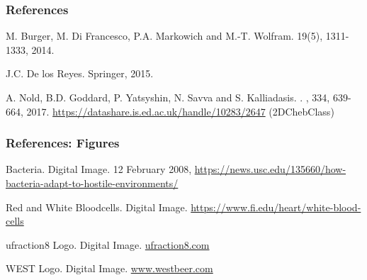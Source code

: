 \documentclass[aspectratio=169,xcolor=dvipsnames]{beamer}
\begin{document}
\begin{frame}
\frametitle{References}    
\begin{thebibliography}{10}    

	M. Burger, M. Di Francesco, P.A. Markowich and  M.-T. Wolfram. 
		 19(5), 1311-1333, 2014. 
	
	J.C. De los Reyes.
	\newblock 	Springer, 2015.
	
	A. Nold, B.D. Goddard, P. Yatsyshin, N. Savva and S. Kalliadasis. 
	.
	, 334, 639-664, 2017.
	\newblock \url{https://datashare.is.ed.ac.uk/handle/10283/2647} (2DChebClass)
\end{thebibliography}
\end{frame}
\begin{frame}
	\frametitle{References: Figures}   
	\begin{thebibliography}{10}    
		
		Bacteria. Digital Image. 12 February 2008, \url{https://news.usc.edu/135660/how-bacteria-adapt-to-hostile-environments/}

		Red and White Bloodcells. Digital Image. \url{https://www.fi.edu/heart/white-blood-cells}

		ufraction8 Logo. Digital Image. 
		\url{ufraction8.com}
		
		WEST Logo. Digital Image.  \url{www.westbeer.com}
	\end{thebibliography}	
\end{frame}
\end{document}
